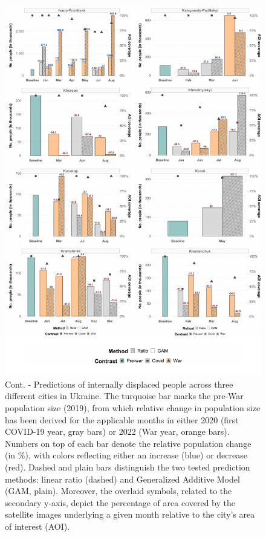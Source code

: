 \documentclass[sn-basic]{sn-jnl}%
\begin{document}
{\begin{appendices}
\begin{figure}[h!]
\begin{center}
\includegraphics[scale = 0.6]{Figures/SM_IDP_pred_Fig2.pdf}
\end{center}
\caption{Cont. - Predictions of internally displaced people across three different cities in Ukraine. The turquoise bar marks the pre-War population size (2019), from which relative change in population size has been derived for the applicable months in either 2020 (first COVID-19 year, gray bars) or 2022 (War year, orange bars). Numbers on top of each bar denote the relative population change (in \%), with colors reflecting either an increase (blue) or decrease (red). Dashed and plain bars distinguish the two tested prediction methods: linear ratio (dashed) and Generalized Additive Model (GAM, plain). Moreover, the overlaid symbols, related to the secondary y-axis, depict the percentage of area covered by the satellite images underlying a given month relative to the city's area of interest (AOI).}
\label{figSM_IDP_pred_Fig2}
\end{figure}


\end{appendices}}
\end{document}
